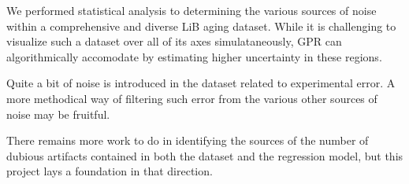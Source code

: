\documentclass[conference]{IEEEtran}
\begin{document}
We performed statistical analysis to determining the various sources
of noise within a comprehensive and diverse LiB aging dataset.
While it is challenging to visualize such a dataset over all
of its axes simulataneously, GPR can algorithmically accomodate
by estimating higher uncertainty in these regions.

Quite a bit of noise is introduced in the dataset related
to experimental error. A more methodical way of filtering
such error from the various other sources of noise may be fruitful.

There remains more work to do in identifying the sources of the
number of dubious artifacts contained in both the dataset
and the regression model, but this project lays a foundation 
in that direction.











\vspace{12pt}
\end{document}
